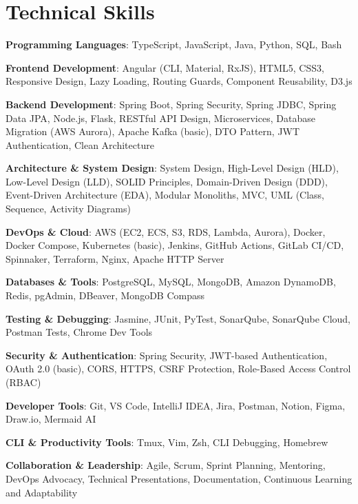 \documentclass[10pt, letterpaper]{article}
\newenvironment{onecolentry}{\begin{adjustwidth}{0 cm}{0 cm}}{\end{adjustwidth}}
\begin{document}
\section{Technical Skills}
\begin{onecolentry}
    \item \textbf{Programming Languages}: TypeScript, JavaScript, Java, Python, SQL, Bash
    \item \textbf{Frontend Development}: Angular (CLI, Material, RxJS), HTML5, CSS3, Responsive Design, Lazy Loading, Routing Guards, Component Reusability, D3.js
    \item \textbf{Backend Development}: Spring Boot, Spring Security, Spring JDBC, Spring Data JPA, Node.js, Flask, RESTful API Design, Microservices, Database Migration (AWS Aurora), Apache Kafka (basic), DTO Pattern, JWT Authentication, Clean Architecture
    \item \textbf{Architecture \& System Design}: System Design, High-Level Design (HLD), Low-Level Design (LLD), SOLID Principles, Domain-Driven Design (DDD), Event-Driven Architecture (EDA), Modular Monoliths, MVC, UML (Class, Sequence, Activity Diagrams)
    \item \textbf{DevOps \& Cloud}: AWS (EC2, ECS, S3, RDS, Lambda, Aurora), Docker, Docker Compose, Kubernetes (basic), Jenkins, GitHub Actions, GitLab CI/CD, Spinnaker, Terraform, Nginx, Apache HTTP Server
    \item \textbf{Databases \& Tools}: PostgreSQL, MySQL, MongoDB, Amazon DynamoDB, Redis, pgAdmin, DBeaver, MongoDB Compass
    \item \textbf{Testing \& Debugging}: Jasmine, JUnit, PyTest, SonarQube, SonarQube Cloud, Postman Tests, Chrome Dev Tools
    \item \textbf{Security \& Authentication}: Spring Security, JWT-based Authentication, OAuth 2.0 (basic), CORS, HTTPS, CSRF Protection, Role-Based Access Control (RBAC)
    \item \textbf{Developer Tools}: Git, VS Code, IntelliJ IDEA, Jira, Postman, Notion, Figma, Draw.io, Mermaid AI
    \item \textbf{CLI \& Productivity Tools}: Tmux, Vim, Zsh, CLI Debugging, Homebrew
    \item \textbf{Collaboration \& Leadership}: Agile, Scrum, Sprint Planning, Mentoring, DevOps Advocacy, Technical Presentations, Documentation, Continuous Learning and Adaptability
\end{onecolentry}
\end{document}
